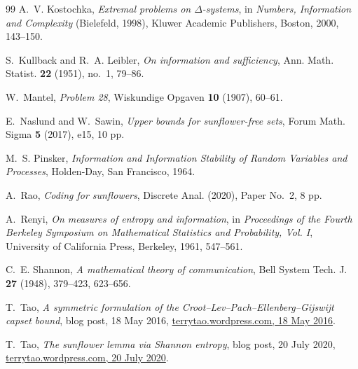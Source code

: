 \documentclass[11pt]{article}
\begin{document}
\begin{thebibliography}{99}
A.~V. Kostochka,
\emph{Extremal problems on $\Delta$-systems},
in \emph{Numbers, Information and Complexity} (Bielefeld, 1998),
Kluwer Academic Publishers, Boston, 2000, 143--150.

S.~Kullback and R.~A. Leibler,
\emph{On information and sufficiency},
Ann. Math. Statist. \textbf{22} (1951), no.~1, 79--86.

W.~Mantel,
\emph{Problem 28},
Wiskundige Opgaven \textbf{10} (1907), 60--61.

E.~Naslund and W.~Sawin,
\emph{Upper bounds for sunflower-free sets},
Forum Math. Sigma \textbf{5} (2017), e15, 10 pp.

M.~S. Pinsker,
\emph{Information and Information Stability of Random Variables and Processes},
Holden-Day, San Francisco, 1964.

A.~Rao,
\emph{Coding for sunflowers},
Discrete Anal. (2020), Paper No.~2, 8 pp.

A.~Renyi,
\emph{On measures of entropy and information},
in \emph{Proceedings of the Fourth Berkeley Symposium on Mathematical
Statistics and Probability, Vol. I}, University of California Press, Berkeley,
1961, 547--561.

C.~E. Shannon,
\emph{A mathematical theory of communication},
Bell System Tech. J. \textbf{27} (1948), 379--423, 623--656.

T.~Tao,
\emph{A symmetric formulation of the Croot--Lev--Pach--Ellenberg--Gijswijt
capset bound},
blog post, 18 May 2016,
\href{https://terrytao.wordpress.com/2016/05/18/a-symmetric-formulation-of-the-croot-lev-pach-ellenberg-gijswijt-capset-bound/}{terrytao.wordpress.com, 18 May 2016}.

T.~Tao,
\emph{The sunflower lemma via Shannon entropy},
blog post, 20 July 2020,
\href{https://terrytao.wordpress.com/2020/07/20/the-sunflower-lemma-via-shannon-entropy/}{terrytao.wordpress.com, 20 July 2020}.

\end{thebibliography}
\end{document}
